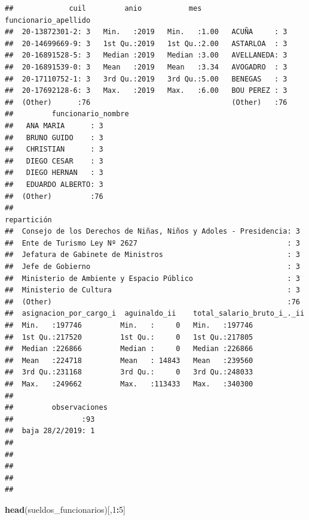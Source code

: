 \documentclass[]{book}
\newenvironment{Shaded}{\begin{snugshade}}{\end{snugshade}}
\newcommand{\DecValTok}[1]{\textcolor[rgb]{0.00,0.00,0.81}{#1}}
\newcommand{\KeywordTok}[1]{\textcolor[rgb]{0.13,0.29,0.53}{\textbf{#1}}}
\newcommand{\NormalTok}[1]{#1}
\newcommand{\OperatorTok}[1]{\textcolor[rgb]{0.81,0.36,0.00}{\textbf{#1}}}
\begin{document}
\begin{verbatim}
##             cuil         anio           mes       funcionario_apellido
##  20-13872301-2: 3   Min.   :2019   Min.   :1.00   ACUÑA     : 3       
##  20-14699669-9: 3   1st Qu.:2019   1st Qu.:2.00   ASTARLOA  : 3       
##  20-16891528-5: 3   Median :2019   Median :3.00   AVELLANEDA: 3       
##  20-16891539-0: 3   Mean   :2019   Mean   :3.34   AVOGADRO  : 3       
##  20-17110752-1: 3   3rd Qu.:2019   3rd Qu.:5.00   BENEGAS   : 3       
##  20-17692128-6: 3   Max.   :2019   Max.   :6.00   BOU PEREZ : 3       
##  (Other)      :76                                 (Other)   :76       
##         funcionario_nombre
##   ANA MARIA      : 3      
##   BRUNO GUIDO    : 3      
##   CHRISTIAN      : 3      
##   DIEGO CESAR    : 3      
##   DIEGO HERNAN   : 3      
##   EDUARDO ALBERTO: 3      
##  (Other)         :76      
##                                                          repartición
##  Consejo de los Derechos de Niñas, Niños y Adoles - Presidencia: 3  
##  Ente de Turismo Ley Nº 2627                                   : 3  
##  Jefatura de Gabinete de Ministros                             : 3  
##  Jefe de Gobierno                                              : 3  
##  Ministerio de Ambiente y Espacio Público                      : 3  
##  Ministerio de Cultura                                         : 3  
##  (Other)                                                       :76  
##  asignacion_por_cargo_i  aguinaldo_ii    total_salario_bruto_i_._ii
##  Min.   :197746         Min.   :     0   Min.   :197746            
##  1st Qu.:217520         1st Qu.:     0   1st Qu.:217805            
##  Median :226866         Median :     0   Median :226866            
##  Mean   :224718         Mean   : 14843   Mean   :239560            
##  3rd Qu.:231168         3rd Qu.:     0   3rd Qu.:248033            
##  Max.   :249662         Max.   :113433   Max.   :340300            
##                                                                    
##         observaciones
##                :93   
##  baja 28/2/2019: 1   
##                      
##                      
##                      
##                      
## 
\end{verbatim}

\begin{Shaded}
\begin{Highlighting}[]
\KeywordTok{head}\NormalTok{(sueldos_funcionarios)[,}\DecValTok{1}\OperatorTok{:}\DecValTok{5}\NormalTok{]}
\end{Highlighting}
\end{Shaded}
\end{document}
